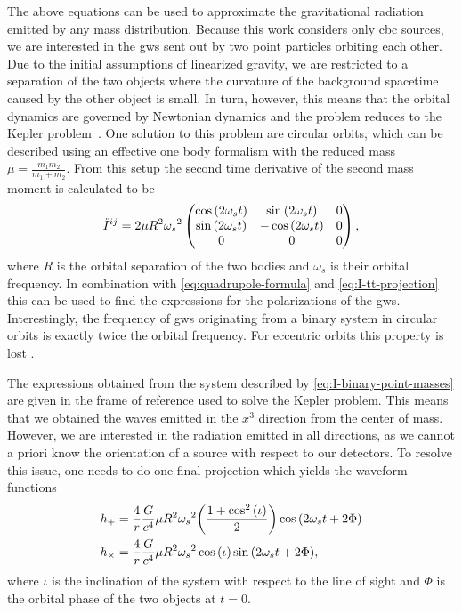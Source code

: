 The above equations can be used to approximate the gravitational radiation emitted by any mass distribution. Because this work considers only \acrshort{cbc} sources, we are interested in the \acrshort{gw}s sent out by two point particles orbiting each other. Due to the initial assumptions of linearized gravity, we are restricted to a separation of the two objects where the curvature of the background spacetime caused by the other object is small. In turn, however, this means that the orbital dynamics are governed by Newtonian dynamics and the problem reduces to the Kepler problem~\cite{Maggiore:2008aaa}. %
One solution to this problem are circular orbits, which can be described using an effective one body formalism with the reduced mass $\mu=\frac{m_1 m_2}{m_1 + m_2}$. From this setup the second time derivative of the second mass moment is calculated to be
\begin{equation}\label{eq:I-binary-point-masses}
\ddot{I}^{ij}=2\mu R^2 {\omega_s}^2
\begin{pmatrix}
\cos{\left( 2\omega_s t \right)} & \sin{\left( 2\omega_s t \right)} & 0\\
\sin{\left( 2\omega_s t \right)} & -\cos{\left( 2\omega_s t \right)} & 0\\
0 & 0 & 0
\end{pmatrix},
\end{equation}
where $R$ is the orbital separation of the two bodies and $\omega_s$ is their orbital frequency. In combination with \eqref{eq:quadrupole-formula} and \eqref{eq:I-tt-projection} this can be used to find the expressions for the polarizations of the \acrshort{gw}s. Interestingly, the frequency of \acrshort{gw}s originating from a binary system in circular orbits is exactly twice the orbital frequency. For eccentric orbits this property is lost \cite{Maggiore:2008aaa}.%

The expressions obtained from the system described by \eqref{eq:I-binary-point-masses} are given in the frame of reference used to solve the Kepler problem. This means that we obtained the waves emitted in the $x^3$ direction from the center of mass. However, we are interested in the radiation emitted in all directions, as we cannot a priori know the orientation of a source with respect to our detectors. To resolve this issue, one needs to do one final projection which yields the waveform functions~\cite{Maggiore:2008aaa}%
\begin{align}\label{eq:circular_orbit_waveforms}
h_+ & = \frac{4}{r}\frac{G}{c^4}\mu R^2 {\omega_s}^2{\left( \frac{1+\cos^2{\left( \iota \right)}}{2} \right)}\cos{\left( 2\omega_s t + 2 \Phi \right)}\nonumber\\
h_\times & = \frac{4}{r}\frac{G}{c^4}\mu R^2 {\omega_s}^2\cos{\left( \iota \right)}\sin{\left( 2\omega_s t + 2 \Phi \right)},
\end{align}
where $\iota$ is the inclination of the system with respect to the line of sight and $\Phi$ is the orbital phase of the two objects at $t=0$.


